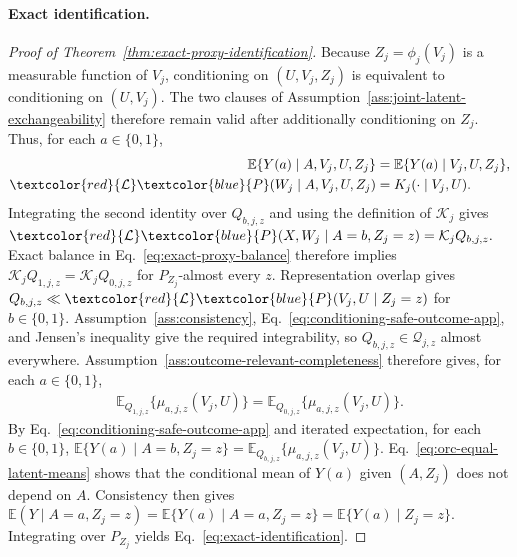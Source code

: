 \paragraph{Exact identification.}
\begin{proof}[Proof of Theorem~\ref{thm:exact-proxy-identification}]
Because $Z_j=\phi_j(V_j)$ is a measurable function of $V_j$, conditioning on $(U,V_j,Z_j)$ is equivalent to conditioning on $(U,V_j)$. The two clauses of Assumption~\ref{ass:joint-latent-exchangeability} therefore remain valid after additionally conditioning on $Z_j$. Thus, for each $a\in\{0,1\}$,
\begin{align}
\mathbb E\{Y(a)\mid A,V_j,U,Z_j\}
&=
\mathbb E\{Y(a)\mid V_j,U,Z_j\},
\label{eq:conditioning-safe-outcome-app}\\
 \textcolor{red}{\mathcal L}\textcolor{blue}{P}(W_j\mid A,V_j,U,Z_j)
&=
K_j(\cdot\mid V_j,U).
\nonumber
\end{align}
Integrating the second identity over $Q_{b,j,z}$ and using the definition of $\mathcal K_j$ gives
\( \textcolor{red}{\mathcal L}\textcolor{blue}{P}(X,W_j\mid A=b,Z_j=z) = \mathcal K_jQ_{b,j,z}.\)
Exact balance in Eq.~\eqref{eq:exact-proxy-balance} therefore implies
\(\mathcal K_jQ_{1,j,z}=\mathcal K_jQ_{0,j,z}\)
for $P_{Z_j}$-almost every $z$. Representation overlap gives $Q_{b,j,z}\ll \textcolor{red}{\mathcal L}\textcolor{blue}{P}(V_j,U\mid Z_j=z)$ for $b\in\{0,1\}$. Assumption~\ref{ass:consistency}, Eq.~\eqref{eq:conditioning-safe-outcome-app}, and Jensen's inequality give the required integrability, so $Q_{b,j,z}\in\mathcal Q_{j,z}$ almost everywhere. Assumption~\ref{ass:outcome-relevant-completeness} therefore gives, for each $a\in\{0,1\}$,
\begin{align}
\mathbb E_{Q_{1,j,z}}\{\mu_{a,j,z}(V_j,U)\}
=
\mathbb E_{Q_{0,j,z}}\{\mu_{a,j,z}(V_j,U)\}.
\label{eq:orc-equal-latent-means}
\end{align}
By Eq.~\eqref{eq:conditioning-safe-outcome-app} and iterated expectation, for each $b\in\{0,1\}$,
\(\mathbb E\{Y(a)\mid A=b,Z_j=z\} = \mathbb E_{Q_{b,j,z}}\{\mu_{a,j,z}(V_j,U)\}.\)
Eq.~\eqref{eq:orc-equal-latent-means} shows that the conditional mean of $Y(a)$ given $(A,Z_j)$ does not depend on $A$. Consistency then gives
\(\mathbb E(Y\mid A=a,Z_j=z) = \mathbb E\{Y(a)\mid A=a,Z_j=z\} = \mathbb E\{Y(a)\mid Z_j=z\}.\)
Integrating over $P_{Z_j}$ yields Eq.~\eqref{eq:exact-identification}.\qedhere
\end{proof}

